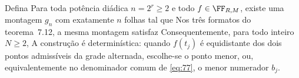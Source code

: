 \begin{teorema}
Defina
Para toda potência diádica $n=2^r\ge2$ e todo $f\in\FF_{R,M}$, existe uma montagem $g_n$ com exatamente $n$ folhas tal que
Nos três formatos do teorema~7.12, a mesma montagem satisfaz
Consequentemente, para todo inteiro $N\ge2$,
A construção é determinística: quando $f(t_j)$ é equidistante dos dois pontos admissíveis da grade alternada, escolhe-se o ponto menor, ou, equivalentemente no denominador comum de \eqref{eq:77}, o menor numerador $b_j$.
\end{teorema}
